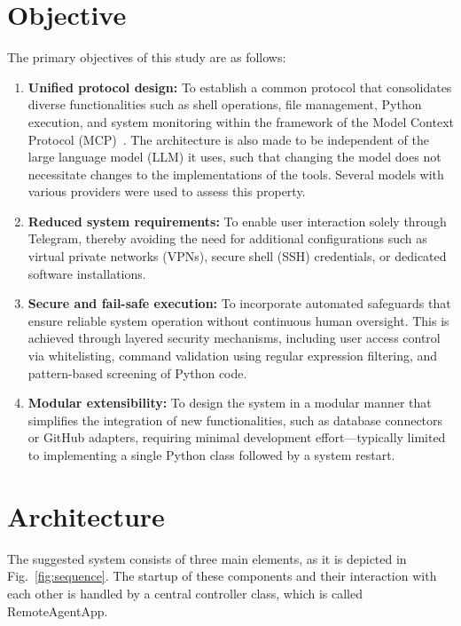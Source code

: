 \documentclass[conference]{IEEEtran}
\begin{document}
\section{Objective}
The primary objectives of this study are as follows:
\begin{enumerate}
    \item \textbf{Unified protocol design:} To establish a common protocol that consolidates diverse functionalities such as shell operations, file management, Python execution, and system monitoring within the framework of the Model Context Protocol (MCP)~\cite{anthropic2024mcp}. The architecture is also made to be independent of the large language model (LLM) it uses, such that changing the model does not necessitate changes to the implementations of the tools. Several models with various providers were used to assess this property.
    
    \item \textbf{Reduced system requirements:} To enable user interaction solely through Telegram, thereby avoiding the need for additional configurations such as virtual private networks (VPNs), secure shell (SSH) credentials, or dedicated software installations.
    
    \item \textbf{Secure and fail-safe execution:} To incorporate automated safeguards that ensure reliable system operation without continuous human oversight. This is achieved through layered security mechanisms, including user access control via whitelisting, command validation using regular expression filtering, and pattern-based screening of Python code.
    
    \item \textbf{Modular extensibility:} To design the system in a modular manner that simplifies the integration of new functionalities, such as database connectors or GitHub adapters, requiring minimal development effort—typically limited to implementing a single Python class followed by a system restart.
\end{enumerate}

\section{Architecture}

The suggested system consists of three main elements, as it is depicted in Fig.~\ref{fig:sequence}. The startup of these components and their interaction with each other is handled by a central controller class, which is called RemoteAgentApp.
\end{document}
